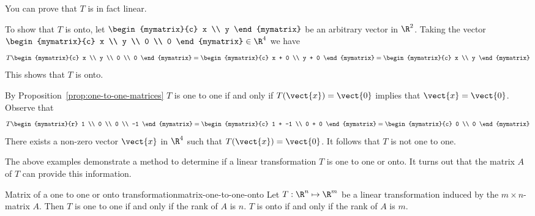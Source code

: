 \begin{solution} 
You can prove that $T$ is in fact linear. 

To show that $T$ is onto, let $\begin{mymatrix}{c} 
x \\
y
\end{mymatrix}$ be an arbitrary vector in $\R^2$. Taking the vector $\begin{mymatrix}{c}
x \\
y \\
0 \\
0 
\end{mymatrix} \in \R^4$ we have 
\[
T \begin{mymatrix}{c}
x \\
y \\
0 \\
0
\end{mymatrix} = 
\begin{mymatrix}{c}
x + 0 \\
y + 0 
\end{mymatrix}
= \begin{mymatrix}{c}
x \\
y 
\end{mymatrix}
\]
This shows that $T$ is onto. 

By Proposition~\ref{prop:one-to-one-matrices} $T$ is one to one if and only if $T(\vect{x}) = \vect{0}$ implies that $\vect{x} = \vect{0}$. Observe that 
\[
T \begin{mymatrix}{r}
1 \\
0 \\
0 \\
-1
\end{mymatrix} = 
\begin{mymatrix}{c}
1 + -1 \\
0 + 0 
\end{mymatrix}
= \begin{mymatrix}{c}
0 \\
0 
\end{mymatrix}
\]
There exists a non-zero vector $\vect{x}$ in $\R^4$ such that $T(\vect{x}) = \vect{0}$. It follows that $T$ is not one to one.
\end{solution}

The above examples demonstrate a method to determine if a linear transformation $T$ is one to one or onto. It turns out that the matrix $A$ of $T$ can provide this information.

\begin{theorem}{Matrix of a one to one or onto transformation}{matrix-one-to-one-onto}
Let $T: \R^n \mapsto \R^m$ be a linear transformation induced by the $m \times n$-matrix $A$. Then $T$ is one to one if and only if the rank of $A$ is $n$. $T$ is onto if and only if the rank of $A$ is $m$. 
\end{theorem}

